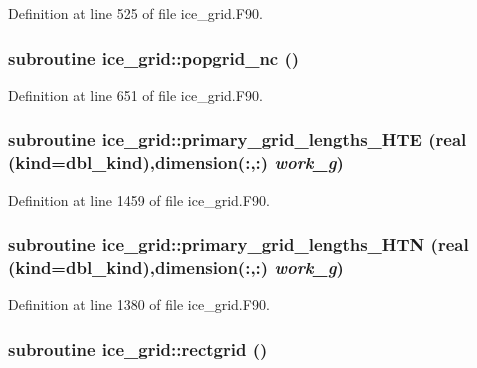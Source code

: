 Definition at line 525 of file ice\_\-grid.F90.\hypertarget{namespaceice__grid_a830c0e85f52a27b04394190410c74730}{
\subsubsection[{popgrid\_\-nc}]{\setlength{\rightskip}{0pt plus 5cm}subroutine ice\_\-grid::popgrid\_\-nc ()}}
\label{namespaceice__grid_a830c0e85f52a27b04394190410c74730}


Definition at line 651 of file ice\_\-grid.F90.\hypertarget{namespaceice__grid_a101630e53001c3cf050c5c5672199c25}{
\subsubsection[{primary\_\-grid\_\-lengths\_\-HTE}]{\setlength{\rightskip}{0pt plus 5cm}subroutine ice\_\-grid::primary\_\-grid\_\-lengths\_\-HTE (real (kind=dbl\_\-kind),dimension(:,:) {\em work\_\-g})}}
\label{namespaceice__grid_a101630e53001c3cf050c5c5672199c25}


Definition at line 1459 of file ice\_\-grid.F90.\hypertarget{namespaceice__grid_a2eadb37992f11dff1d497737f391f976}{
\subsubsection[{primary\_\-grid\_\-lengths\_\-HTN}]{\setlength{\rightskip}{0pt plus 5cm}subroutine ice\_\-grid::primary\_\-grid\_\-lengths\_\-HTN (real (kind=dbl\_\-kind),dimension(:,:) {\em work\_\-g})}}
\label{namespaceice__grid_a2eadb37992f11dff1d497737f391f976}


Definition at line 1380 of file ice\_\-grid.F90.\hypertarget{namespaceice__grid_a2368fc9f9adb4dd4c869e9e618923640}{
\subsubsection[{rectgrid}]{\setlength{\rightskip}{0pt plus 5cm}subroutine ice\_\-grid::rectgrid ()}}
\label{namespaceice__grid_a2368fc9f9adb4dd4c869e9e618923640}


